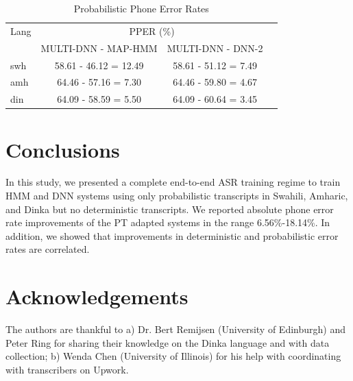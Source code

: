 \documentclass[a4paper]{article}
\newcommand{\myvspacesec}{\vspace{-2mm}}
\begin{document}
\begin{table}
\vspace{-2mm}
\centering %
\caption{Probabilistic Phone Error Rates} \label{Tab:PPER}
\vspace{-3mm}
\begin{tabular}{l|c c c}
   \hline
Lang  & \multicolumn{2}{c}{PPER (\%)} \\
          &  \footnotesize{MULTI-DNN - MAP-HMM} & \footnotesize{MULTI-DNN - DNN-2}  \\ \hline
swh      &  58.61 - 46.12 = 12.49 & 58.61 - 51.12 = 7.49  \\
amh      & 64.46 - 57.16 = 7.30   & 64.46 - 59.80 = 4.67  \\
din      & 64.09 - 58.59 = 5.50   & 64.09 - 60.64 = 3.45 \\ \hline
\end{tabular}
\vspace{-7mm}
\end{table}

\vspace{-2mm}
\myvspacesec
\section{Conclusions} \vspace{-1mm}
In this study, we presented a complete end-to-end ASR training regime to train HMM and DNN systems using only probabilistic transcripts in Swahili, Amharic, and Dinka but no deterministic transcripts. We reported absolute phone error rate improvements of the PT adapted systems in the range 6.56\%-18.14\%. In addition, we showed that improvements in deterministic and probabilistic error rates are correlated.

\vspace{-1mm}
\myvspacesec
\section{Acknowledgements} \vspace{-1mm}
The authors are thankful to a) Dr. Bert Remijsen (University of Edinburgh) and Peter Ring for sharing their knowledge on the Dinka language and with data collection; b) Wenda Chen (University of Illinois) for his help with coordinating with transcribers on Upwork.

\end{document}
